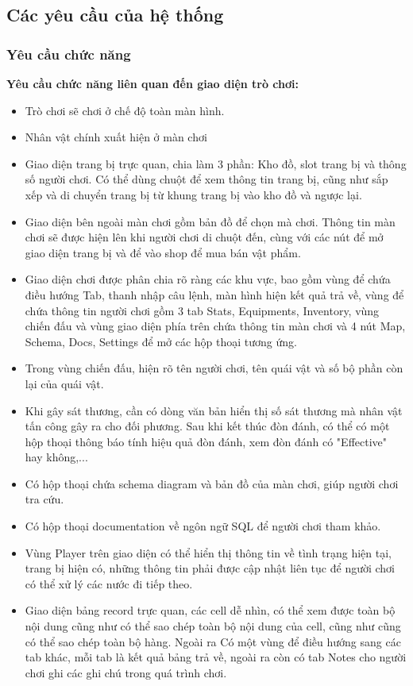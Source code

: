 \subsection{Các yêu cầu của hệ thống}
\subsubsection{Yêu cầu chức năng}
\textbf{Yêu cầu chức năng liên quan đến giao diện trò chơi:}
\begin{itemize}
	\item Trò chơi sẽ chơi ở chế độ toàn màn hình.
	\item Nhân vật chính xuất hiện ở màn chơi
	\item Giao diện trang bị trực quan, chia làm 3 phần: Kho đồ, slot trang bị và thông số người chơi. Có thể dùng chuột để xem thông tin trang bị, cũng như sắp xếp và di chuyển trang bị từ khung trang bị vào kho đồ và ngược lại.
	\item Giao diện bên ngoài màn chơi gồm bản đồ để chọn mà chơi. Thông tin màn chơi sẽ được hiện lên khi người chơi di chuột đến, cùng với các nút để mở giao diện trang bị và để vào shop để mua bán vật phẩm.
	\item Giao diện chơi được phân chia rõ ràng các khu vực, bao gồm vùng để chứa điều hướng Tab, thanh nhập câu lệnh, màn hình hiện kết quả trả về, vùng để chứa thông tin người chơi gồm 3 tab Stats, Equipments, Inventory, vùng chiến đấu và vùng giao diện phía trên chứa thông tin màn chơi và 4 nút Map, Schema, Docs, Settings để mở các hộp thoại tương ứng.
	\item Trong vùng chiến đấu, hiện rõ tên người chơi, tên quái vật và số bộ phần còn lại của quái vật.
	\item Khi gây sát thương, cần có dòng văn bản hiển thị số sát thương mà nhân vật tấn công gây ra cho đối phương. Sau khi kết thúc đòn đánh, có thể có một hộp thoại thông báo tính hiệu quả đòn đánh, xem đòn đánh có "Effective" hay không,...
	\item Có hộp thoại chứa schema diagram và bản đồ của màn chơi, giúp người chơi tra cứu.
	\item Có hộp thoại documentation về ngôn ngữ SQL để người chơi tham khảo.
	\item Vùng Player trên giao diện có thể hiển thị thông tin về tình trạng hiện tại, trang bị hiện có, những thông tin phải được cập nhật liên tục để người chơi có thể xử lý các nước đi tiếp theo.
	\item Giao diện bảng record trực quan, các cell dễ nhìn, có thể xem được toàn bộ nội dung cũng như có thể sao chép toàn bộ nội dung của cell, cũng như cũng có thể sao chép toàn bộ hàng. Ngoài ra Có một vùng để điều hướng sang các tab khác, mỗi tab là kết quả bảng trả về, ngoài ra còn có tab Notes cho người chơi ghi các ghi chú trong quá trình chơi.

\end{itemize}
